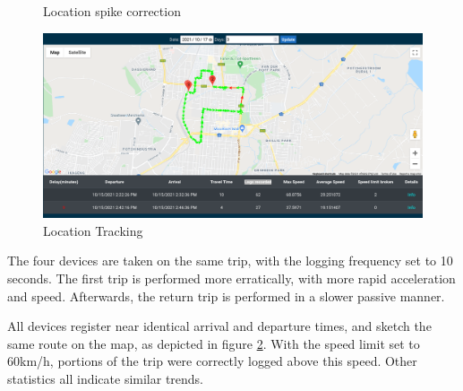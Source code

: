 \begin{figure}[H]
\centering
\caption{Location spike correction}
\label{fig:spike_correction}
\end{figure}

\begin{figure}[H]
\centering
\includegraphics[width=6in]{eval_location.png}
\caption{Location Tracking}
\label{fig:eval_location}
\end{figure}

The four devices are taken on the same trip, with the logging frequency set to 10 seconds.
The first trip is performed more erratically, with more rapid acceleration and speed.
Afterwards, the return trip is performed in a slower passive manner.

All devices register near identical arrival and departure times, and sketch the same route on the map, as depicted in figure \ref{fig:eval_location}.
With the speed limit set to 60km/h, portions of the trip were correctly logged above this speed.
Other statistics all indicate similar trends.


